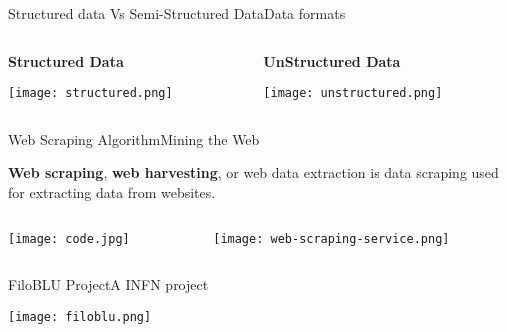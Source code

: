 \documentclass{standalone}
\begin{document}
\begin{frame}{Structured data Vs Semi-Structured Data}{Data formats}

  \begin{columns}

    \begin{column}{0.5\textwidth}
      \textbf{Structured Data}

      \vspace{0.5cm}

      \centering\texttt{[image: structured.png]}
    \end{column}

    \begin{column}{0.5\textwidth}
      \textbf{UnStructured Data}

      \vspace{0.85cm}

      \centering\texttt{[image: unstructured.png]}
    \end{column}

  \end{columns}

\end{frame}


\begin{frame}{Web Scraping Algorithm}{Mining the Web}

  \textbf{Web scraping}, \textbf{web harvesting}, or web data extraction is data scraping used for extracting data from websites.

  \begin{columns}
    \begin{column}{0.3\textwidth}
      \centering\texttt{[image: code.jpg]}
    \end{column}
    \begin{column}{0.7\textwidth}
      \centering\texttt{[image: web-scraping-service.png]}
    \end{column}
  \end{columns}

\end{frame}


\begin{frame}{FiloBLU Project}{A INFN project}

  \centering\texttt{[image: filoblu.png]}

\end{frame}
\end{document}
